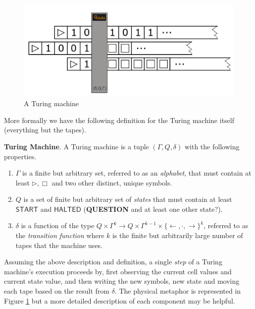 \documentclass[usletter]{article}
\begin{document}
\begin{figure}
\begin{center}
\includegraphics[width=1\textwidth]{lectures/graphics/turing-machine}
\end{center}
\caption{A Turing machine}
\label{fig:turing-machine}
\end{figure}

More formally we have the following definition for the Turing machine itself (everything but the tapes).

\begin{definition}
  \textbf{Turing Machine}. A Turing machine is a tuple $(\Gamma, Q, \delta)$ with the following properties.
  \begin{enumerate}
    \item $\Gamma$ is a finite but arbitrary set, referred to as an \textit{alphabet}, that must contain at least $\rhd, \Box$ and two other distinct, unique symbols.
    \item $Q$ is a set of finite but arbitrary set of \textit{states} that must contain at least $\textsf{START}$ and $\textsf{HALTED}$ (\textbf{QUESTION} and at least one other state?).
    \item $\delta$ is a function of the type $Q \times \Gamma^{k} \rightarrow Q \times \Gamma^{k-1} \times \{\leftarrow, \cdot, \rightarrow\}^k$, referred to as the \textit{transition function} where $k$ is the finite but arbitrarily large number of tapes that the machine uses.
  \end{enumerate}
\end{definition}


Assuming the above description and definition, a single \textit{step} of a Turing machine's execution proceeds by, first observing the current cell values and current state value, and then writing the new symbols, new state and moving each tape based on the result from $\delta$. The physical metaphor is represented in Figure \ref{fig:turing-machine} but a more detailed description of each component may be helpful.
\end{document}

